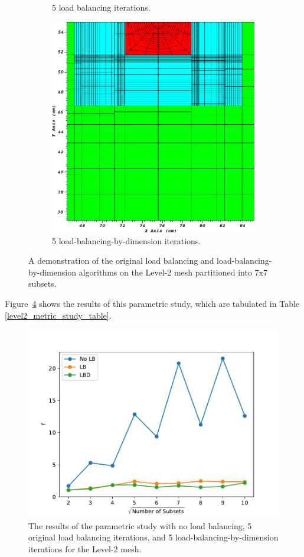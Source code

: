 \begin{figure}[ht]
\begin{subfigure}[b]{\textwidth}
\caption{5 load balancing iterations.}
\label{7_lb}
\end{subfigure}
\begin{subfigure}[b]{\textwidth}
\centering
\includegraphics[scale=0.3]{../figures/level2_7_lbd_zoom.png}
\caption{5 load-balancing-by-dimension iterations.}
\label{7_lbd}
\end{subfigure}
\caption{A demonstration of the original load balancing and load-balancing-by-dimension algorithms on the Level-2 mesh partitioned into 7x7 subsets.}
\label{level2_alg_illustration}
\end{figure}
Figure~\ref{level2_metric_study} shows the results of this parametric study, which are tabulated in Table \ref{level2_metric_study_table}.
\begin{figure}[H]
\centering
\includegraphics[scale=0.7]{../figures/level2_metric_study.pdf}
\caption{The results of the parametric study with no load balancing, 5 original load balancing iterations, and 5 load-balancing-by-dimension iterations for the Level-2 mesh.}
\label{level2_metric_study}
\end{figure}
